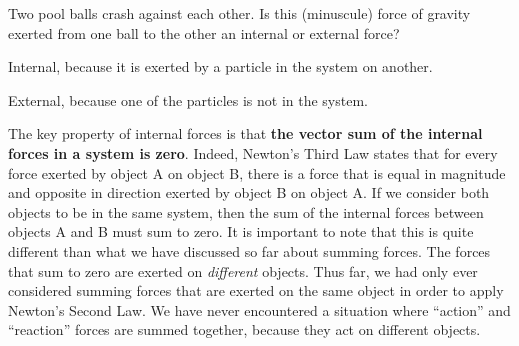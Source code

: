 \begin{checkpoint}
\begin{MCquestion}{Two pool balls crash against each other. Is this (minuscule) force of gravity exerted from one ball to the other an internal or external force?}
\item Internal, because it is exerted by a particle in the system on another. %
\item External, because one of the particles is not in the system.
\end{MCquestion}
\end{checkpoint}

The key property of internal forces is that \textbf{the vector sum of the internal forces in a system is zero}. Indeed, Newton's Third Law states that for every force exerted by object A on object B, there is a force that is equal in magnitude and opposite in direction exerted by object B on object A. If we consider both objects to be in the same system, then the sum of the internal forces between objects A and B must sum to zero. It is important to note that this is quite different than what we have discussed so far about summing forces. The forces that sum to zero are exerted on \textit{different} objects. Thus far, we had only ever considered summing forces that are exerted on the same object in order to apply Newton's Second Law. We have never encountered a situation where ``action'' and ``reaction'' forces are summed together, because they act on different objects.

